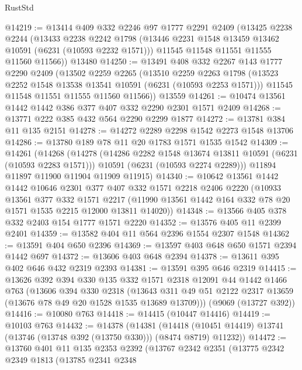 \begin{lexlean}{RustStd}
\begin{coremodule}
{{@14219 := @13414
    @409
    @332
    @2246
    @97
    @1777
    @2291
    @2409
    (@13425
      @2238
      @2244
      (@13433
        @2238
        @2242
        @1798
        (@13446 @2231 @1548 @13459 @13462 @10591 (@6231 (@10593 @2232 @1571)))
        @11545
        @11548
        @11551
        @11555
        @11560
        @11566))
    @13480
@14250 := @13491
    @408
    @332
    @2267
    @143
    @1777
    @2290
    @2409
    (@13502
      @2259
      @2265
      (@13510
        @2259
        @2263
        @1798
        (@13523 @2252 @1548 @13538 @13541 @10591 (@6231 (@10593 @2253 @1571)))
        @11545
        @11548
        @11551
        @11555
        @11560
        @11566))
    @13559
@14261 := @10474 @13561 @1442 @1442 @386 @377 @407 @332 @2290 @2301 @1571 @2409
@14268 := @13771 @222 @385 @432 @564 @2290 @2299 @1877
@14272 := @13781 @384 @11 @135 @2151
@14278 := @14272 @2289 @2298 @1542 @2273 @1548 @13706
@14286 := @13780 @189 @78 @11 @20 @1783 @1571 @1535 @1542
@14309 := @14261
    (@14268
      (@14278
        (@14286 @2282 @1548 @13674 @13811 @10591 (@6231 (@10593 @2283 @1571)))
        @10591
        (@6231 (@10593 @2274 @2289)))
      @11894
      @11897
      @11900
      @11904
      @11909
      @11915)
@14340 := @10642
    @13561
    @1442
    @1442
    @10646
    @2301
    @377
    @407
    @332
    @1571
    @2218
    @2406
    @2220
    (@10933
      @13561
      @377
      @332
      @1571
      @2217
      (@11990 @13561 @1442 @164 @332 @78 @20 @1571 @1535 @2215 @12000 @13811 @14020))
@14348 := @13566 @405 @378 @332 @2403 @154 @1777 @1571 @2220
@14352 := @13576 @405 @11 @2399 @2401
@14359 := @13582 @404 @11 @564 @2396 @1554 @2307 @1548
@14362 := @13591 @404 @650 @2396
@14369 := @13597 @403 @648 @650 @1571 @2394 @1442 @697
@14372 := @13606 @403 @648 @2394
@14378 := @13611 @395 @402 @646 @432 @2319 @2393
@14381 := @13591 @395 @646 @2319
@14415 := @13626
    @392
    @394
    @330
    @135
    @332
    @1571
    @2318
    @12091
    @44
    @1442
    @1466
    @763
    (@13606
      @394
      @330
      @2318
      (@13643 @311 @49 @51 @2122 @2317 @13659 (@13676 @78 @49 @20 @1528 @1535 @13689 @13709)))
    (@9069 (@13727 @392))
@14416 := @10080 @763
@14418 := @14415 (@10447 @14416)
@14419 := @10103 @763
@14432 := @14378
    (@14381
      (@14418 (@10451 @14419) @13741 (@13746 (@13748 @392 (@13750 @330))) (@8474 @8719) @11232))
@14472 := @13760
    @401
    @11
    @135
    @2353
    @2392
    (@13767
      @2342
      @2351
      (@13775
        @2342
        @2349
        @1813
        (@13785
          @2341
          @2348
}}
\end{coremodule}
\end{lexlean}
